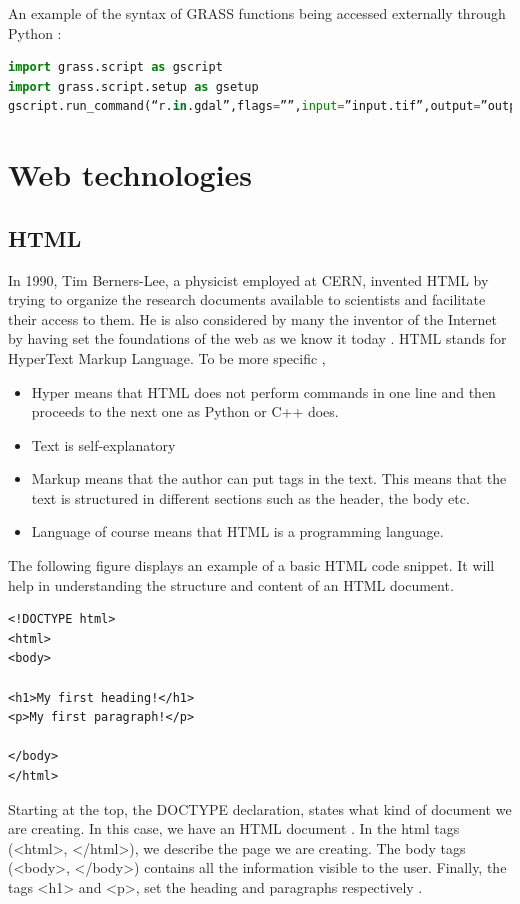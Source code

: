 An example of the syntax of GRASS functions being accessed externally through Python \citep{grasswiki}:

\begin{lstlisting}[language=Python]
import grass.script as gscript
import grass.script.setup as gsetup
gscript.run_command(“r.in.gdal”,flags=””,input=”input.tif”,output=”output”
\end{lstlisting}


\section{Web technologies}
\subsection{HTML}
In 1990, Tim Berners-Lee, a physicist employed at CERN, invented HTML by trying to organize the research documents available to scientists and facilitate their access to them. He is also considered by many the inventor of the Internet by having set the foundations of the web as we know it today \citep{htmlnet}.
HTML stands for HyperText Markup Language. To be more specific \citep{htmlnet},

\begin{itemize}
\item Hyper means that HTML does not perform commands in one line and then proceeds to the next one as Python or C++ does.
\item Text is self-explanatory
\item Markup means that the author can put tags in the text. This means that the text is structured in different sections such as the header, the body etc.
\item Language of course means that HTML is a programming language.
\end{itemize}

The following figure displays an example of a basic HTML code snippet. It will help in understanding the structure and content of an HTML document.

\begin{lstlisting}
<!DOCTYPE html>
<html>
<body>

<h1>My first heading!</h1>
<p>My first paragraph!</p>

</body>
</html>
\end{lstlisting}

Starting at the top, the DOCTYPE declaration, states what kind of document we are creating. In this case, we have an HTML document \citep{w3schools}. In the html tags (<html>, </html>), we describe the page we are creating. The body tags (<body>, </body>) contains all the information visible to the user. Finally, the tags <h1> and <p>, set the heading and paragraphs respectively \citep{w3schools}.

